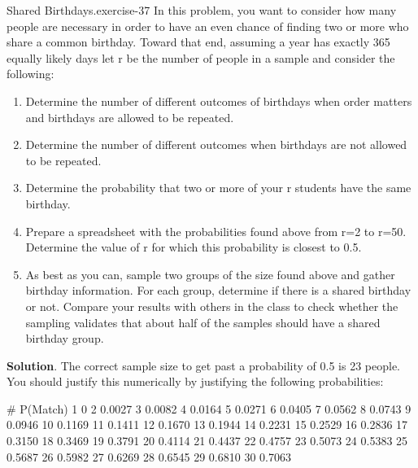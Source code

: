 \documentclass[10pt,]{book}
\numberwithin{equation}{section}
\begin{document}
%
\par
\hypertarget{p-615}{}%
\begin{inlineexercise}{Shared Birthdays.}{exercise-37}%
\hypertarget{p-616}{}%
In this problem, you want to consider how many people are necessary in order to have an even chance of finding two or more who share a common birthday. Toward that end, assuming a year has exactly 365 equally likely days let r be the number of people in a sample and consider the following: \leavevmode%
\begin{enumerate}
\item\hypertarget{li-168}{}Determine the number of different outcomes of birthdays when order matters and birthdays are allowed to be repeated.%
\item\hypertarget{li-169}{}Determine the number of different outcomes when birthdays are not allowed to be repeated.%
\item\hypertarget{li-170}{}Determine the probability that two or more of your r students have the same birthday.%
\item\hypertarget{li-171}{}Prepare a spreadsheet with the probabilities found above from r=2 to r=50. Determine the value of r for which this probability is closest to 0.5.%
\item\hypertarget{li-172}{}As best as you can, sample two groups of the size found above and gather birthday information. For each group, determine if there is a shared birthday or not.  Compare your results with others in the class to check whether the sampling validates that about half of the samples should have a shared birthday group.%
\end{enumerate}
%
\par\smallskip%
\noindent\textbf{Solution}.\hypertarget{solution-15}{}\quad%
\hypertarget{p-617}{}%
The correct sample size to get past a probability of 0.5 is 23 people. You should justify this numerically by justifying the following probabilities:\begin{preformatted}
#	P(Match)	
1	0
2	0.0027
3	0.0082
4	0.0164
5	0.0271
6	0.0405
7	0.0562
8	0.0743
9	0.0946
10	0.1169
11	0.1411
12	0.1670
13	0.1944
14	0.2231
15	0.2529
16	0.2836
17	0.3150
18	0.3469
19	0.3791
20	0.4114
21	0.4437
22	0.4757
23	0.5073
24	0.5383
25	0.5687
26	0.5982
27	0.6269
28	0.6545
29	0.6810
30	0.7063
\end{preformatted}
%
\end{inlineexercise}
%
\par
\hypertarget{p-618}{}%
\end{document}
